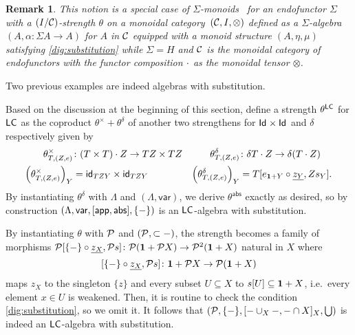 \documentclass[acmsmall,review]{acmart}\settopmatter{printfolios=true,printccs=false,printacmref=false}
\theoremstyle{acmdefinition}
\newtheorem*{remark*}{Remark}
\begin{document}
\begin{remark*}
  This notion is a special case of \emph{$\Sigma$-monoids}~\citep{Fiore2008} for an endofunctor $\Sigma$ with a $(I/\catC)$-strength $\theta$ on a monoidal category~$(\catC, I, \otimes)$ defined as a $\Sigma$-algebra $(A, \alpha\colon \Sigma A \to A)$ for $A$ in $\catC$ equipped with a monoid structure $(A, \eta, \mu)$ satisfying \eqref{dig:substitution} while $\Sigma = H$ and $\catC$ is the monoidal category of endofunctors with the functor composition $\fcomp$ as the monoidal tensor $\otimes$.
\end{remark*}

Two previous examples are indeed algebras with substitution.
\begin{example}
  Based on the discussion at the beginning of this section, define a strength $\theta^{\LC}$ for $\LC$ as the coproduct
  $\theta^{\times} + \theta^{\delta} $ of another two strengthens for $\Id \times \Id$ and $\delta$ respectively given by
  \begin{align*}
    \theta_{T, (Z, e)}^{\times} &\colon (T \times T) \fcomp Z \to TZ \times TZ  &
    \theta_{T, (Z, e)}^{\delta} &\colon \delta T \fcomp Z \to \delta (T \fcomp Z) \\
    \left(\theta_{T, (Z, e)}^{\times}\right)_Y & = \idfunc[TZY] \times \idfunc[TZY] &
    \left(\theta_{T, (Z, e)}^{\delta}\right)_Y & = T[e_{\Unit + Y} \comp \underline{z_Y}, Zs_Y].
  \end{align*}
  By instantiating $\theta^\delta$ with $\Lambda$ and $(\Lambda, \mathsf{var})$, we derive $\theta^{\mathsf{abs}}$ exactly as desired, so by construction $(\Lambda, \mathsf{var}, [\mathsf{app}, \mathsf{abs}], \subst{\blank})$ is an $\LC$-algebra with substitution.
\end{example}

\begin{example} \label{ex:free-variable-alg-subst}
  By instantiating $\theta$ with $\power$ and $(\power, \subset{\blank})$, the strength becomes a family of morphisms $\power[\subst{\blank} \comp \underline{z_X}, \power s]\colon \power(\Unit + \power X) \to \power^2(\Unit + X)$ natural in $X$ where 
  \[
    [\subst{\blank} \comp \underline{z_X}, \power s] \colon \Unit + \power X \to \power(\Unit + X)
  \]
  maps $z_X$ to the singleton $\{z\}$ and every subset $U \subseteq X$ to $s[U] \subseteq \Unit + X$, i.e.\ every element $x \in U$ is weakened.
  Then, it is routine to check the condition \eqref{dig:substitution}, so we omit it.
  It follows that $(\power, \{\blank\}, [\blank\cup_X\blank, \blank \cap X]_X, \bigcup)$ is indeed an $\LC$-algebra with substitution.
\end{example}
\end{document}
